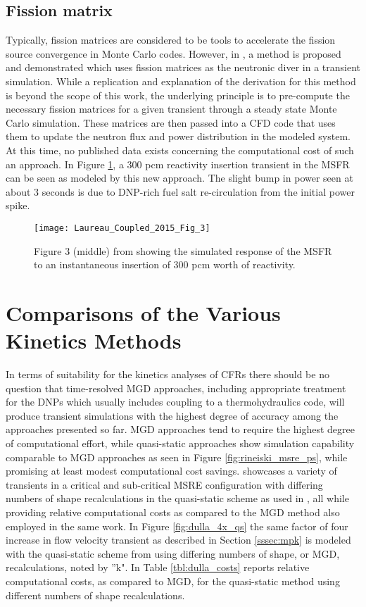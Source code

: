 \documentclass[review]{elsarticle}
\begin{document}
\subsection{Fission matrix}
Typically, fission matrices are considered to be tools to accelerate the fission
source convergence in Monte Carlo codes. However, in 
\cite{laureau_coupled_2015}, a method is proposed and demonstrated which uses
fission matrices as the neutronic diver in a transient simulation. While a
replication and explanation of the derivation for this method is beyond the
scope of this work, the underlying principle is to pre-compute the necessary
fission matrices for a given transient through a steady state Monte Carlo
simulation. These matrices are then passed into a CFD code that uses them
to update the neutron flux and power distribution in the modeled system. At
this time, no published data exists concerning the computational cost
of such an approach. In Figure \ref{fig:laureau_msfr}, a 300 pcm reactivity
insertion transient in the MSFR can be seen as modeled by this new approach. The
slight bump in power seen at about 3 seconds is due to DNP-rich fuel salt
re-circulation from the initial power spike.

\begin{figure}[H]
   \centering
   \texttt{[image: Laureau\_Coupled\_2015\_Fig\_3]}
   \caption{Figure 3 (middle) from \cite{laureau_coupled_2015} showing the simulated response of
   the MSFR to an instantaneous insertion of 300 pcm worth of reactivity.} 
   \label{fig:laureau_msfr}
\end{figure}

\section{Comparisons of the Various Kinetics Methods}
\label{sec:comp}
In terms of suitability for the kinetics analyses of CFRs there should be no
question that time-resolved MGD approaches, including appropriate treatment
for the DNPs which usually includes coupling to a thermohydraulics code, will
produce transient simulations with the highest degree of accuracy among the
approaches presented so far. MGD approaches tend to require the highest
degree of computational effort, while quasi-static approaches 
show simulation capability comparable to MGD approaches as seen in
Figure \ref{fig:rineiski_msre_ps},  while promising at
least modest computational cost savings. \cite{dulla_models_2005} showcases
a variety of transients in a critical and sub-critical MSRE configuration with
differing numbers of shape recalculations in the quasi-static scheme as used in
\cite{dulla_models_2005} , all while providing relative computational costs
 as compared to the MGD method
also employed in the same work. In Figure \ref{fig:dulla_4x_qs} the same factor
of four increase in flow velocity transient as described in Section
\ref{sssec:mpk} is modeled with the quasi-static scheme from
\cite{dulla_models_2005} using differing numbers of shape, or MGD,
recalculations, noted by ''k". In Table \ref{tbl:dulla_costs}
\cite{dulla_models_2005} reports relative computational costs, as compared to
MGD, for the quasi-static method using different numbers of shape recalculations.
\end{document}
